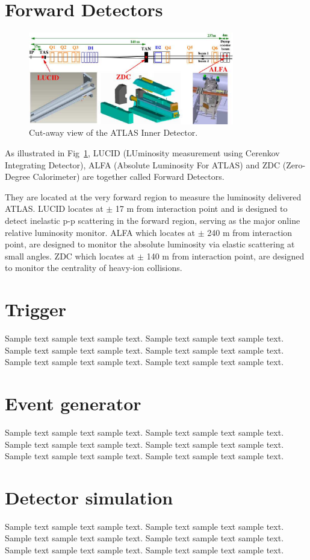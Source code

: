 \section{Forward Detectors}
\label{sec:for}
\begin{figure}[htbp]
 \begin{center}
  \includegraphics[width=0.8\textwidth]{chapters/c4/figures/forward}
 \end{center}
  \caption{Cut-away view of the ATLAS Inner Detector.}
 \label{fig:forward}
\end{figure}
\par As illustrated in Fig~\ref{fig:forward}, LUCID (LUminosity measurement using Cerenkov Integrating Detector), ALFA (Absolute Luminosity For ATLAS) and ZDC 
 (Zero-Degree Calorimeter) are together called Forward Detectors. 
 \par They are located at the very forward region to measure the luminosity delivered ATLAS. LUCID locates at $\pm$ 17 m from interaction point and is designed to 
 detect inelastic p-p scattering in the forward region, serving as the major online relative luminosity monitor. 
 ALFA which locates at $\pm$ 240 m from interaction point, are designed to monitor the absolute luminosity via elastic scattering at small angles. 
 ZDC which locates at $\pm$ 140 m from interaction point, are designed to monitor the centrality of heavy-ion collisions.

\section{Trigger}
Sample text sample text sample text. Sample text sample text sample text.
Sample text sample text sample text. Sample text sample text sample text.
Sample text sample text sample text. Sample text sample text sample text.

\section{Event generator}
\label{sec:data}
Sample text sample text sample text. Sample text sample text sample text.
Sample text sample text sample text. Sample text sample text sample text.
Sample text sample text sample text. Sample text sample text sample text.

\section{Detector simulation}
Sample text sample text sample text. Sample text sample text sample text.
Sample text sample text sample text. Sample text sample text sample text.
Sample text sample text sample text. Sample text sample text sample text.
